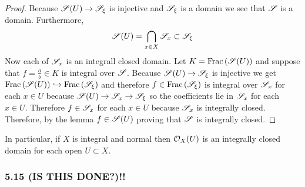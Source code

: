 \documentclass[12pt]{article}
\begin{document}
\begin{proof}
Because $\mathscr{S}(U) \to \mathscr{S}_\xi$ is injective and $\mathscr{S}_\xi$ is a domain we see that $\mathscr{S}$ is a domain. Furthermore,
\[ \mathscr{S}(U) = \bigcap_{x \in X} \mathscr{S}_x \subset \mathscr{S}_\xi \]
Now each of $\mathscr{S}_x$ is an integrall closed domain. Let $K = \mathrm{Frac}\left(\mathscr{S}(U)\right)$ and suppose that $f = \frac{a}{b} \in K$ is integral over $\mathscr{S}$. Because $\mathscr{S}(U) \to \mathscr{S}_\xi$ is injective we get $\mathrm{Frac}\left(\mathscr{S}(U)\right) \hookrightarrow \mathrm{Frac}\left(\mathscr{S}_\xi\right)$ and therefore $f \in \mathrm{Frac}\left(\mathscr{S}_\xi\right)$ is integral over $\mathscr{S}_x$ for each $x \in U$ because $\mathscr{S}(U) \to \mathscr{S}_x \to \mathscr{S}_\xi$ so the coefficients lie in $\mathscr{S}_x$ for each $x \in U$. Therefore $f \in \mathscr{S}_x$ for each $x \in U$ because $\mathscr{S}_x$ is integrally closed. Therefore, by the lemma $f \in \mathscr{S}(U)$ proving that $\mathscr{S}$ is integrally closed.
\end{proof}

\begin{rmk}
In particular, if $X$ is integral and normal then $\mathcal{O}_{X}(U)$ is an integrally closed domain for each open $U \subset X$.
\end{rmk}

\subsubsection{5.15 (IS THIS DONE?)!!}
\end{document}
